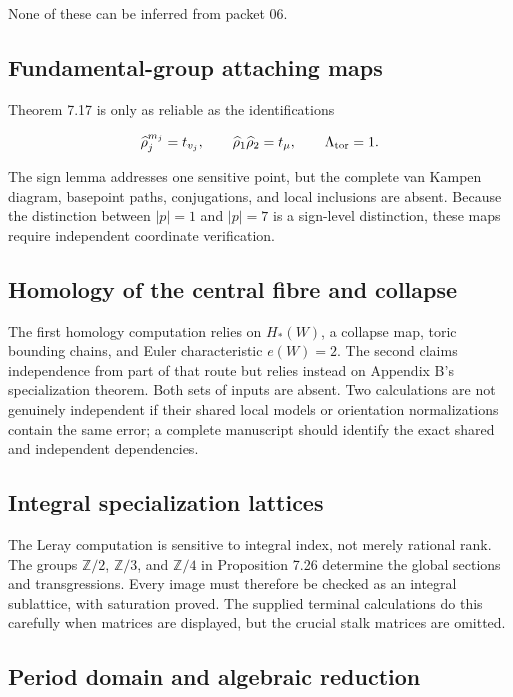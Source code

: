 \documentclass[
  10pt,
]{article}
\begin{document}
None of these can be inferred from packet 06.

\subsection{Fundamental-group attaching
maps}\label{fundamental-group-attaching-maps}

Theorem 7.17 is only as reliable as the identifications

\[
\widehat\rho_j^{m_j}=t_{v_j},
\qquad
\widehat\rho_1\widehat\rho_2=t_\mu,
\qquad
\Lambda_{\rm tor}=1.
\]

The sign lemma addresses one sensitive point, but the complete van
Kampen diagram, basepoint paths, conjugations, and local inclusions are
absent. Because the distinction between \(|p|=1\) and \(|p|=7\) is a
sign-level distinction, these maps require independent coordinate
verification.

\subsection{Homology of the central fibre and
collapse}\label{homology-of-the-central-fibre-and-collapse}

The first homology computation relies on \(H_*(W)\), a collapse map,
toric bounding chains, and Euler characteristic \(e(W)=2\). The second
claims independence from part of that route but relies instead on
Appendix B's specialization theorem. Both sets of inputs are absent. Two
calculations are not genuinely independent if their shared local models
or orientation normalizations contain the same error; a complete
manuscript should identify the exact shared and independent
dependencies.

\subsection{Integral specialization
lattices}\label{integral-specialization-lattices}

The Leray computation is sensitive to integral index, not merely
rational rank. The groups \(\mathbb Z/2\), \(\mathbb Z/3\), and
\(\mathbb Z/4\) in Proposition 7.26 determine the global sections and
transgressions. Every image must therefore be checked as an integral
sublattice, with saturation proved. The supplied terminal calculations
do this carefully when matrices are displayed, but the crucial stalk
matrices are omitted.

\subsection{Period domain and algebraic
reduction}\label{period-domain-and-algebraic-reduction}
\end{document}
